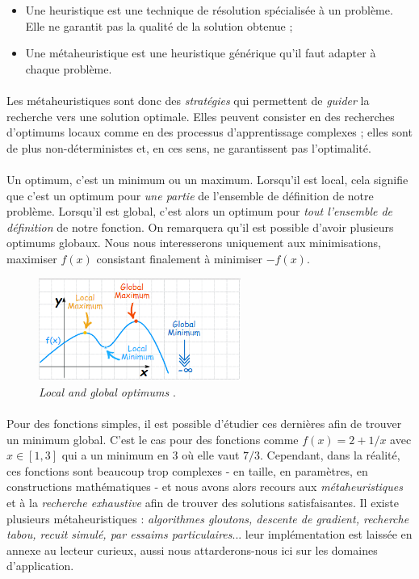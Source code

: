 \begin{itemize}
    \item Une heuristique est une technique de résolution spécialisée à un problème. Elle ne garantit pas la qualité de
    la solution obtenue ;
    \item Une métaheuristique est une heuristique générique qu’il faut adapter à chaque problème.
\end{itemize}

\paragraph{} Les métaheuristiques sont donc des \emph{stratégies} qui permettent de \emph{guider} la recherche vers une
solution optimale. Elles peuvent consister en des recherches d'optimums locaux comme en des processus d'apprentissage complexes ;
elles sont de plus non-déterministes et, en ces sens, ne garantissent pas l'optimalité.

\paragraph{} Un optimum, c'est un minimum ou un maximum. Lorsqu'il est local, cela signifie que c'est un optimum pour \emph{une
partie} de l'ensemble de définition de notre problème. Lorsqu'il est global, c'est alors un optimum pour \emph{tout l'ensemble
de définition} de notre fonction. On remarquera qu'il est possible d'avoir plusieurs optimums globaux. Nous nous interesserons 
uniquement aux minimisations, maximiser $f(x)$ consistant finalement à minimiser $-f(x)$.

\begin{figure}[ht]
    \centering
    \includegraphics[width=250px]{chapters/03/images/optimums.png}
    \caption{\label{optimums}\emph{Local and global optimums} \cite{Optimums0}.}
\end{figure}

\paragraph{} Pour des fonctions simples, il est possible d'étudier ces dernières afin de trouver un minimum global.
C'est le cas pour des fonctions comme $f(x) = 2 + 1/x$ avec $x \in [1, 3]$ qui a un minimum en 3 où elle vaut $7/3$.
Cependant, dans la réalité, ces fonctions sont beaucoup trop complexes - en taille, en paramètres, en constructions
mathématiques - et nous avons alors recours aux \emph{métaheuristiques} et à la \emph{recherche exhaustive} afin
de trouver des solutions satisfaisantes. Il existe plusieurs métaheuristiques : \emph{algorithmes gloutons, descente
de gradient, recherche tabou, recuit simulé, par essaims particulaires}... leur implémentation est laissée
en annexe au lecteur curieux, aussi nous attarderons-nous ici sur les domaines d'application.

